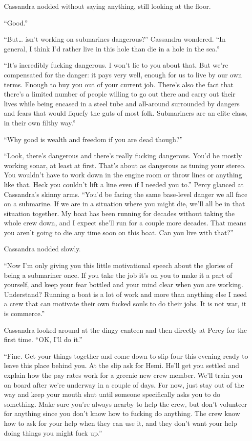 \documentclass[
]{scrbook}
\begin{document}
Cassandra nodded without saying anything, still looking at the floor.

``Good.''

``But\ldots{} isn't working on submarines dangerous?'' Cassandra
wondered. ``In general, I think I'd rather live in this hole than die in
a hole in the sea.''

``It's incredibly fucking dangerous. I won't lie to you about that. But
we're compensated for the danger: it pays very well, enough for us to
live by our own terms. Enough to buy you out of your current job.
There's also the fact that there's a limited number of people willing to
go out there and carry out their lives while being encased in a steel
tube and all-around surrounded by dangers and fears that would liquefy
the guts of most folk. Submariners are an elite class, in their own
filthy way.''

``Why good is wealth and freedom if you are dead though?''

``Look, there's dangerous and there's really fucking dangerous. You'd be
mostly working sonar, at least at first. That's about as dangerous as
tuning your stereo. You wouldn't have to work down in the engine room or
throw lines or anything like that. Heck you couldn't lift a line even if
I needed you to.'' Percy glanced at Cassandra's skinny arms. ``You'd be
facing the same base-level danger we all face on a submarine. If we are
in a situation where you might die, we'll all be in that situation
together. My boat has been running for decades without taking the whole
crew down, and I expect she'll run for a couple more decades. That means
you aren't going to die any time soon on this boat. Can you live with
that?''

Cassandra nodded slowly.

``Now I'm only giving you this little motivational speech about the
glories of being a submariner once. If you take the job it's on you to
make it a part of yourself, and keep your fear bottled and your mind
clear when you are working. Understand? Running a boat is a lot of work
and more than anything else I need a crew that can motivate their own
fucked souls to do their jobs. It is not war, it is commerce.''

Cassandra looked around at the dingy canteen and then directly at Percy
for the first time. ``OK, I'll do it.''

``Fine. Get your things together and come down to slip four this evening
ready to leave this place behind you. At the slip ask for Hemi. He'll
get you settled and explain how the pay rates work for a greenie new
crew member. We'll train you on board after we're underway in a couple
of days. For now, just stay out of the way and keep your mouth shut
until someone specifically asks you to do something. Make sure you're
always nearby to help the crew, but don't volunteer for anything since
you don't know how to fucking do anything. The crew know how to ask for
your help when they can use it, and they don't want your help doing
things you might fuck up.''
\end{document}
